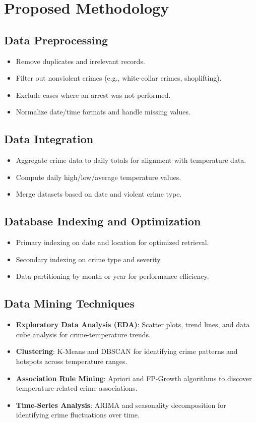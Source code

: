 \documentclass[sigconf]{acmart}
\begin{document}
\section{Proposed Methodology}

\subsection{Data Preprocessing}
\begin{itemize}
    \item Remove duplicates and irrelevant records.
    \item Filter out nonviolent crimes (e.g., white-collar crimes, shoplifting).
    \item Exclude cases where an arrest was not performed.
    \item Normalize date/time formats and handle missing values.
\end{itemize}

\subsection{Data Integration}
\begin{itemize}
    \item Aggregate crime data to daily totals for alignment with temperature data.
    \item Compute daily high/low/average temperature values.
    \item Merge datasets based on date and violent crime type.
\end{itemize}

\subsection{Database Indexing and Optimization}
\begin{itemize}
    \item Primary indexing on date and location for optimized retrieval.
    \item Secondary indexing on crime type and severity.
    \item Data partitioning by month or year for performance efficiency.
\end{itemize}

\subsection{Data Mining Techniques}
\begin{itemize}
    \item \textbf{Exploratory Data Analysis (EDA)}: Scatter plots, trend lines, and data cube analysis for crime-temperature trends.
    \item \textbf{Clustering}: K-Means and DBSCAN for identifying crime patterns and hotspots across temperature ranges.
    \item \textbf{Association Rule Mining}: Apriori and FP-Growth algorithms to discover temperature-related crime associations.
    \item \textbf{Time-Series Analysis}: ARIMA and seasonality decomposition for identifying crime fluctuations over time.
\end{itemize}
\end{document}
